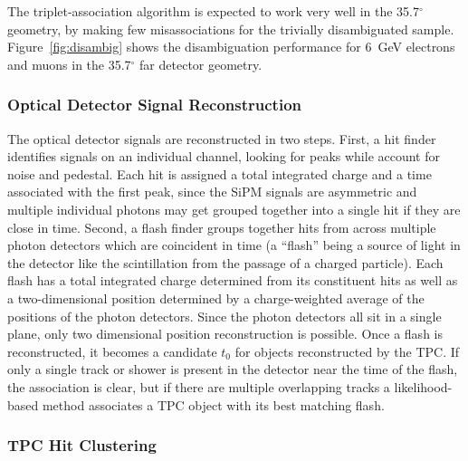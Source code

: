 The triplet-association algorithm is expected to work very well in the
35.7$^\circ$ geometry, by making few misassociations for the trivially
disambiguated sample.  Figure~\ref{fig:disambig} shows the
disambiguation performance for 6~GeV electrons and muons in the
35.7$^\circ$ far detector geometry.

\subsubsection{Optical Detector Signal Reconstruction}

The optical detector signals are reconstructed in two steps.  First, a
hit finder identifies signals on an individual channel, looking for
peaks while account for noise and pedestal.  Each hit is assigned a
total integrated charge and a time associated with the first peak,
since the SiPM signals are asymmetric and multiple individual photons
may get grouped together into a single hit if they are close in time.
Second, a flash finder groups together hits from across multiple
photon detectors which are coincident in time (a ``flash'' being a
source of light in the detector like the scintillation from the
passage of a charged particle).  Each flash has a total integrated
charge determined from its constituent hits as well as a
two-dimensional position determined by a charge-weighted average of
the positions of the photon detectors.  Since the photon detectors all
sit in a single plane, only two dimensional position reconstruction is
possible.  Once a flash is reconstructed, it becomes a candidate $t_0$
for objects reconstructed by the TPC.  If only a single track or
shower is present in the detector near the time of the flash, the
association is clear, but if there are multiple overlapping tracks a
likelihood-based method associates a TPC object with its best matching
flash.

\subsubsection{TPC Hit Clustering}


